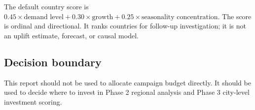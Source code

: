 \begin{methodnote}
The default country score is \(0.45\times\text{demand level} + 0.30\times\text{growth} + 0.25\times\text{seasonality concentration}\). The score is ordinal and directional. It ranks countries for follow-up investigation; it is not an uplift estimate, forecast, or causal model.
\end{methodnote}

\subsection{Decision boundary}

\begin{limitation}
This report should not be used to allocate campaign budget directly. It should be used to decide where to invest in Phase 2 regional analysis and Phase 3 city-level investment scoring.
\end{limitation}
